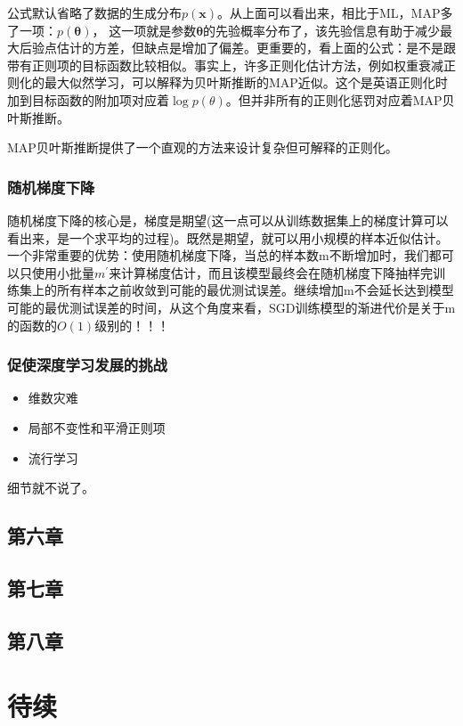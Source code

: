 公式默认省略了数据的生成分布$p(\mathbf{x})$。从上面可以看出来，相比于ML，MAP多了一项：$ p(\mathbf{\theta})$， 这一项就是参数$\mathbf{\theta}$的先验概率分布了，该先验信息有助于减少最大后验点估计的方差，但缺点是增加了偏差。更重要的，看上面的公式：是不是跟带有正则项的目标函数比较相似。事实上，许多正则化估计方法，例如权重衰减正则化的最大似然学习，可以解释为贝叶斯推断的MAP近似。这个是英语正则化时加到目标函数的附加项对应着$\log p(\theta)$。但并非所有的正则化惩罚对应着MAP贝叶斯推断。

MAP贝叶斯推断提供了一个直观的方法来设计复杂但可解释的正则化。

\subsubsection{随机梯度下降}

随机梯度下降的核心是，梯度是期望(这一点可以从训练数据集上的梯度计算可以看出来，是一个求平均的过程)。既然是期望，就可以用小规模的样本近似估计。一个非常重要的优势：使用随机梯度下降，当总的样本数m不断增加时，我们都可以只使用小批量$m^{'}$来计算梯度估计，而且该模型最终会在随机梯度下降抽样完训练集上的所有样本之前收敛到可能的最优测试误差。继续增加m不会延长达到模型可能的最优测试误差的时间，从这个角度来看，SGD训练模型的渐进代价是关于m的函数的$O(1)$级别的！！！

\subsubsection{促使深度学习发展的挑战}

\begin{itemize}
\item 维数灾难
\item 局部不变性和平滑正则项
\item 流行学习
\end{itemize}

细节就不说了。

\subsection{第六章}


\subsection{第七章}


\subsection{第八章}







\section{待续}













